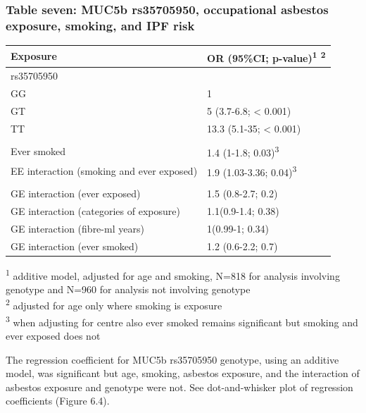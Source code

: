 \documentclass[
]{article}
\begin{document}
\hypertarget{table-seven-muc5b-rs35705950-occupational-asbestos-exposure-smoking-and-ipf-risk}{%
\subsubsection{Table seven: MUC5b rs35705950, occupational asbestos
exposure, smoking, and IPF
risk}\label{table-seven-muc5b-rs35705950-occupational-asbestos-exposure-smoking-and-ipf-risk}}

\begin{longtable}[]{@{}ll@{}}
\toprule
Exposure & OR (95\%CI; p-value)\textsuperscript{1}
\textsuperscript{2}\tabularnewline
\midrule
\endhead
rs35705950 &\tabularnewline
GG & 1\tabularnewline
GT & 5 (3.7-6.8; \textless{} 0.001)\tabularnewline
TT & 13.3 (5.1-35; \textless{} 0.001)\tabularnewline
&\tabularnewline
Ever smoked & 1.4 (1-1.8; 0.03)\textsuperscript{3}\tabularnewline
EE interaction (smoking and ever exposed) & 1.9 (1.03-3.36;
0.04)\textsuperscript{3}\tabularnewline
&\tabularnewline
GE interaction (ever exposed) & 1.5 (0.8-2.7; 0.2)\tabularnewline
GE interaction (categories of exposure) & 1.1(0.9-1.4;
0.38)\tabularnewline
GE interaction (fibre-ml years) & 1(0.99-1; 0.34)\tabularnewline
GE interaction (ever smoked) & 1.2 (0.6-2.2; 0.7)\tabularnewline
\bottomrule
\end{longtable}

\textsuperscript{1} additive model, adjusted for age and smoking, N=818
for analysis involving genotype and N=960 for analysis not involving
genotype\\
\textsuperscript{2} adjusted for age only where smoking is exposure\\
\textsuperscript{3} when adjusting for centre also ever smoked remains
significant but smoking and ever exposed does not

The regression coefficient for MUC5b rs35705950 genotype, using an
additive model, was significant but age, smoking, asbestos exposure, and
the interaction of asbestos exposure and genotype were not. See
dot-and-whisker plot of regression coefficients (Figure 6.4).
\end{document}
